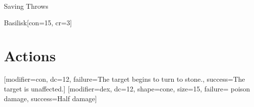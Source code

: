 \begin{ExampleBlock}{Saving Throws}
\begin{RpgStat}{Basilisk}[con=15, cr=3]
    \section{Actions}
        [modifier=con, dc=12,
            failure={The target begins to turn to stone.}, success={The target is unaffected.}]
        [modifier=dex, dc=12, shape=cone, size=15,
            failure={ poison damage}, success={Half damage}]
\end{RpgStat}


\end{ExampleBlock}
